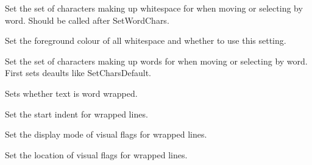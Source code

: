 \label{wxstyledtextctrlsetwhitespacechars}


Set the set of characters making up whitespace for when moving or selecting by word.
Should be called after SetWordChars.


\label{wxstyledtextctrlsetwhitespaceforeground}


Set the foreground colour of all whitespace and whether to use this setting.


\label{wxstyledtextctrlsetwordchars}


Set the set of characters making up words for when moving or selecting by word.
First sets deaults like SetCharsDefault.


\label{wxstyledtextctrlsetwrapmode}


Sets whether text is word wrapped.


\label{wxstyledtextctrlsetwrapstartindent}


Set the start indent for wrapped lines.


\label{wxstyledtextctrlsetwrapvisualflags}


Set the display mode of visual flags for wrapped lines.


\label{wxstyledtextctrlsetwrapvisualflagslocation}


Set the location of visual flags for wrapped lines.


\label{wxstyledtextctrlsetxcaretpolicy}

